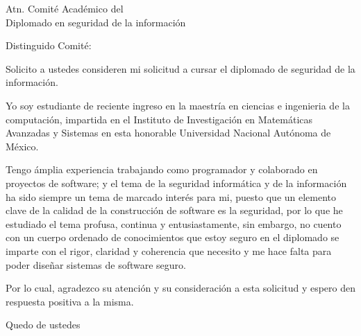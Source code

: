 \documentclass{letter}
\begin{document}
 
\begin{letter}{Atn. Comité Académico del \\Diplomado en seguridad de la información}
\opening{Distinguido Comité:}

Solicito a ustedes consideren mi solicitud a cursar el diplomado de seguridad de la información.

Yo soy estudiante de reciente ingreso en la maestría en ciencias e ingenieria de la computación, impartida en el Instituto de Investigación en Matemáticas Avanzadas y Sistemas en esta honorable Universidad Nacional Autónoma de México.

Tengo ámplia experiencia trabajando como programador y colaborado en proyectos de software; y el tema de la seguridad informática y de la información ha sido siempre un tema de marcado interés para mi, puesto que un elemento clave de la calidad de la construcción de software es la seguridad, por lo que he estudiado el tema profusa, continua y entusiastamente, sin embargo, no cuento con un cuerpo ordenado de conocimientos que estoy seguro en el diplomado se imparte con el rigor, claridad y coherencia que necesito y me hace falta para poder diseñar sistemas de software seguro.

Por lo cual, agradezco su atención y su consideración a esta solicitud y espero den respuesta positiva a la misma.

\closing{Quedo de ustedes}
  
\end{letter}
 
\end{document}
